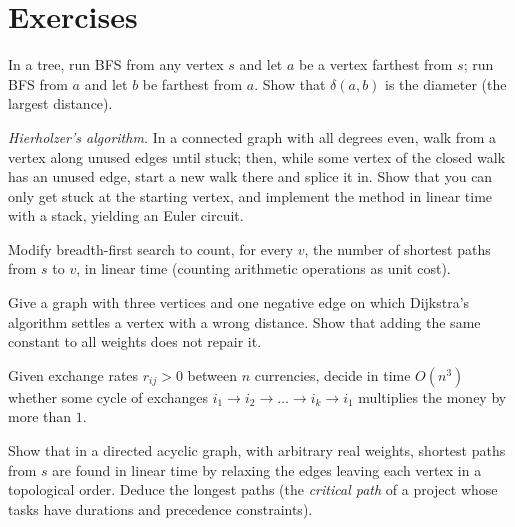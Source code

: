 \section{Exercises}

\begin{exercise}[$\star$]\label{ex:treediam}
In a tree, run BFS from any vertex $s$ and let $a$ be a vertex farthest from $s$; run BFS from $a$ and let $b$ be farthest from $a$. Show that $\delta(a,b)$ is the diameter (the largest distance).
\end{exercise}

\begin{exercise}[$\star\star$]\label{ex:euler}
\emph{Hierholzer's algorithm.} In a connected graph with all degrees even, walk from a vertex along unused edges until stuck; then, while some vertex of the closed walk has an unused edge, start a new walk there and splice it in.
Show that you can only get stuck at the starting vertex, and implement the method in linear time with a stack, yielding an Euler circuit.
\end{exercise}

\begin{exercise}[$\star$]\label{ex:countpaths}
Modify breadth-first search to count, for every $v$, the number of shortest paths from $s$ to $v$, in linear time (counting arithmetic operations as unit cost).
\end{exercise}

\begin{exercise}[$\star$]\label{ex:dijkstraneg}
Give a graph with three vertices and one negative edge on which Dijkstra's algorithm settles a vertex with a wrong distance. Show that adding the same constant to all weights does not repair it.
\end{exercise}

\begin{exercise}[$\star$]\label{ex:arbitrage}
Given exchange rates $r_{ij}>0$ between $n$ currencies, decide in time $O(n^3)$ whether some cycle of exchanges $i_1\to i_2\to\dots\to i_k\to i_1$ multiplies the money by more than $1$.
\end{exercise}

\begin{exercise}[$\star$]\label{ex:dagsp}
Show that in a directed acyclic graph, with arbitrary real weights, shortest paths from $s$ are found in linear time by relaxing the edges leaving each vertex in a topological order. Deduce the longest paths
(the \emph{critical path} of a project whose tasks have durations and precedence constraints).
\end{exercise}

